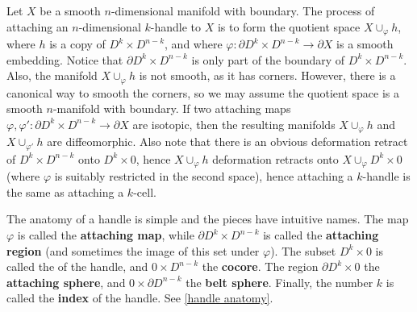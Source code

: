 Let $X$ be a smooth $n$-dimensional manifold with boundary. The process of attaching an $n$-dimensional $k$-handle to $X$ is to form the quotient space $X \cup_\varphi h$, where $h$ is a copy of $D^k \times D^{n-k}$, and where $\varphi : \partial D^k \times D^{n-k} \rightarrow \partial X$ is a smooth embedding. Notice that $\partial D^k \times D^{n-k}$ is only part of the boundary of $D^k \times D^{n-k}$. Also, the manifold $X \cup_\varphi h$ is not smooth, as it has corners. However, there is a canonical way to smooth the corners, so we may assume the quotient space is a smooth $n$-manifold with boundary. If two attaching maps $\varphi,\varphi' : \partial D^k \times D^{n-k} \rightarrow \partial X$ are isotopic, then the resulting manifolds $X \cup_\varphi h$ and $X \cup_{\varphi'} h$ are diffeomorphic. Also note that there is an obvious deformation retract of $D^k \times D^{n-k}$ onto $D^k \times 0$, hence $X \cup_\varphi h$ deformation retracts onto $X \cup_\varphi D^k \times 0$ (where $\varphi$ is suitably restricted in the second space), hence attaching a $k$-handle is the same as attaching a $k$-cell.


The anatomy of a handle is simple and the pieces have intuitive names. The map $\varphi$ is called the \textbf{attaching map}, while $\partial D^k \times D^{n-k}$ is called the \textbf{attaching region} (and sometimes the image of this set under $\varphi$). The subset $D^k \times 0$ is called the  of the handle, and $0 \times D^{n-k}$ the \textbf{cocore}. The region $\partial D^k \times 0$ the \textbf{attaching sphere}, and $0 \times \partial D^{n-k}$ the \textbf{belt sphere}. Finally, the number $k$ is called the \textbf{index} of the handle. See \cref{handle anatomy}. 

